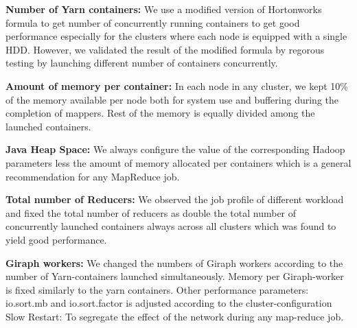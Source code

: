 \documentclass[conference]{IEEEtran}
\begin{document}
\textbf{Number of Yarn containers:} We use a modified version of Hortonworks formula to get number of concurrently running containers to get good performance especially for the clusters where each node is equipped with a single HDD. However, we validated the result of the modified formula by regorous testing by launching different number of containers concurrently.

\textbf{Amount of memory per container:} In each node in any cluster, we kept 10\% of the memory available per node both for system use and buffering during the completion of mappers. Rest of the memory is equally divided among the launched containers.

\textbf{Java Heap Space:} We always configure the value of the corresponding Hadoop parameters less the amount of memory allocated per containers which is a general recommendation for any MapReduce job.

\textbf{Total number of Reducers:} We observed the job profile of different workload and fixed the total number of reducers as double the total number of concurrently launched containers always across all clusters which was found to yield good performance. 

\textbf{Giraph workers:} We changed the numbers of Giraph workers according to the number of Yarn-containers launched simultaneously. Memory per Giraph-worker is fixed similarly to the yarn containers.
Other performance parameters: io.sort.mb and io.sort.factor is adjusted according to the cluster-configuration
Slow Restart: To segregate the effect of the network during any map-reduce job.
\end{document}
